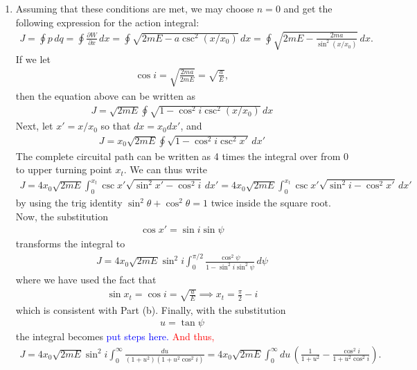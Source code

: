 \documentclass{article}
\theoremstyle{definition}
\newcommand{\p}{\partial}
\newcommand{\f}[2]{\frac{#1}{#2}}
\newcommand{\lp}{\left(}
\newcommand{\rp}{\right)}
\begin{document}
\begin{enumerate}[label=(\alph*)]
	
	\item Assuming that these conditions are met, we may choose $n=0$ and get the following expression for the action integral:
	\begin{align*}
	J = \oint p\,dq = \oint \f{\p W}{\p x}\,dx = \oint \sqrt{2mE - a\csc^2(x/x_0)}\,dx = \oint \sqrt{2mE - \f{2ma}{\sin^2(x/x_0)}}\,dx.
	\end{align*}
	If we let
	\begin{align*}
	\cos i = \sqrt{\f{2ma}{2mE}} = \sqrt{\f{a}{E}},
	\end{align*}
	then the equation above can be written as
	\begin{align*}
	J = \sqrt{2mE}\oint \sqrt{1- \cos^2 i \csc^2(x/x_0)}\,dx
	\end{align*}
	Next, let $x' = x/x_0$ so that $dx = x_0 dx'$, and
	\begin{align*}
	J = x_0\sqrt{2mE}\oint \sqrt{1- \cos^2 i \csc^2 x'}\,dx'
	\end{align*}
	The complete circuital path can be written as 4 times the integral over from $0$ to upper turning point $x_t$. We can thus write
	\begin{align*}
	J = 4x_0\sqrt{2mE}\int_0^{x_t} \csc x' \sqrt{\sin^2 x' - \cos^2 i }\,dx'  = 4x_0\sqrt{2mE}\int_0^{x_t} \csc x' \sqrt{\sin^2 i - \cos^2 x' }\,dx'
	\end{align*}
	by using the trig identity $\sin^2\theta + \cos^2\theta = 1$ twice inside the square root. Now, the substitution 
	\begin{align*}
	\cos x' = \sin i \sin\psi
	\end{align*}
	transforms the integral to 
	\begin{align*}
	J = 4x_0\sqrt{2mE}\sin^2 i \int_0^{\pi/2} \f{\cos^2\psi }{1-\sin^2 i \sin^2\psi}   \,d\psi
	\end{align*}
	where we have used the fact that 
	\begin{align*}
	\sin x_t = \cos i = \sqrt{\f{a}{E}}\implies x_t = \f{\pi}{2} - i
	\end{align*}
	which is consistent with Part (b). Finally, with the substitution
	\begin{align*}
	u = \tan\psi
	\end{align*}
	the integral becomes
	\textcolor{blue}{put steps here.}
	\textcolor{red}{And thus,}
	\begin{align*}
	J = 4x_0\sqrt{2mE} \sin^2 i \int_0^\infty \f{du}{(1+u^2)(1+u^2\cos^2i)} = 4x_0\sqrt{2mE} \int_0^\infty du\,\lp \f{1}{1+u^2} - \f{\cos^2 i}{1 + u^2\cos^2 i} \rp.
	\end{align*}

\end{enumerate}
\end{document}

